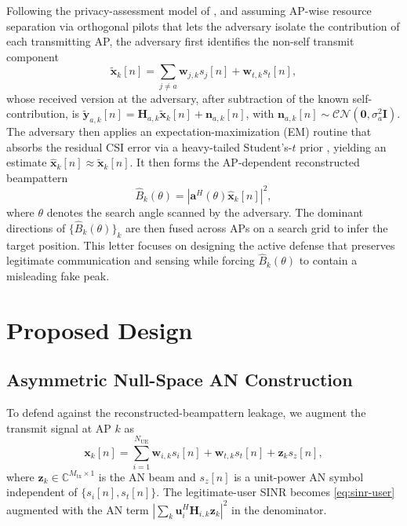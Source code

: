 \documentclass[lettersize,journal]{IEEEtran}
\begin{document}
Following the privacy-assessment model of \cite{dasilva2023multistaticcf}, and assuming AP-wise resource separation via orthogonal pilots that lets the adversary isolate the contribution of each transmitting AP, the adversary first identifies the non-self transmit component
\begin{equation}
\widetilde{\mathbf{x}}_k[n]=\sum_{j\neq a}\mathbf{w}_{j,k}s_j[n]+\mathbf{w}_{t,k}s_t[n],
\end{equation}
whose received version at the adversary, after subtraction of the known self-contribution, is $\widetilde{\mathbf{y}}_{a,k}[n]=\mathbf{H}_{a,k}\widetilde{\mathbf{x}}_k[n]+\mathbf{n}_{a,k}[n]$, with $\mathbf{n}_{a,k}[n]\sim\mathcal{CN}(\mathbf{0},\sigma_a^2\mathbf{I})$. The adversary then applies an expectation-maximization (EM) routine that absorbs the residual CSI error via a heavy-tailed Student's-$t$ prior \cite{dasilva2023multistaticcf}, yielding an estimate $\widehat{\mathbf{x}}_k[n]\approx\widetilde{\mathbf{x}}_k[n]$. It then forms the AP-dependent reconstructed beampattern
\begin{equation}
\widehat{B}_k(\theta)=\left|\mathbf{a}^H(\theta)\widehat{\mathbf{x}}_k[n]\right|^2,
\label{eq:beampattern}
\end{equation}
where $\theta$ denotes the search angle scanned by the adversary.
The dominant directions of $\{\widehat{B}_k(\theta)\}_k$ are then fused across APs on a search grid to infer the target position. This letter focuses on designing the active defense that preserves legitimate communication and sensing while forcing $\widehat{B}_k(\theta)$ to contain a misleading fake peak.

\section{Proposed Design}
\subsection{Asymmetric Null-Space AN Construction}
\label{subsec:asym}

To defend against the reconstructed-beampattern leakage, we augment the transmit signal at AP $k$ as
\begin{equation}
\mathbf{x}_k[n]=\sum_{i=1}^{N_{\mathrm{UE}}}\mathbf{w}_{i,k}s_i[n]+\mathbf{w}_{t,k}s_t[n]+\mathbf{z}_ks_z[n],
\label{eq:xk-an}
\end{equation}
where $\mathbf{z}_k\in\mathbb{C}^{M_{\mathrm{tx}}\times 1}$ is the AN beam and $s_z[n]$ is a unit-power AN symbol independent of $\{s_i[n],s_t[n]\}$. The legitimate-user SINR becomes \eqref{eq:sinr-user} augmented with the AN term $|\sum_k\mathbf{u}_i^H\mathbf{H}_{i,k}\mathbf{z}_k|^2$ in the denominator.
\end{document}
